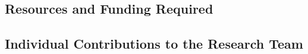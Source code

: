 
\subsection{Resources and Funding Required}


\subsection{Individual Contributions to the Research Team}



